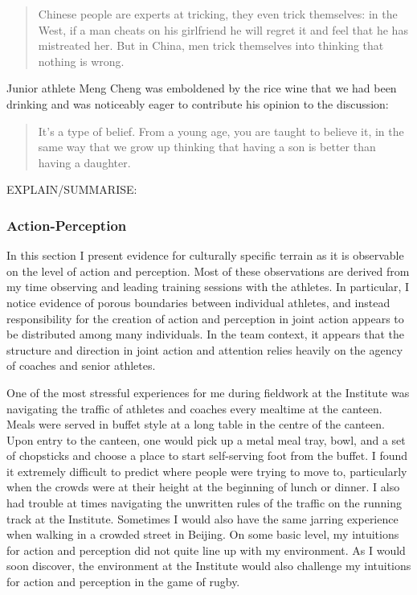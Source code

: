 \begin{CJK}{UTF8}{gbsn}
  \begin{quotation}
    Chinese people are experts at tricking, they even trick themselves: in the West, if a man cheats on his girlfriend he will regret it and feel that he has mistreated her.  But in China, men trick themselves into thinking that nothing is wrong.
  \end{quotation}


  Junior athlete Meng Cheng was emboldened by the rice wine that we had been drinking and was noticeably eager to contribute his opinion to the discussion:

  \begin{quotation}
    It's a type of belief. From a young age, you are taught to believe it, in the same way that we grow up thinking that having a son is better than having a daughter.
  \end{quotation}

  EXPLAIN/SUMMARISE:





  \subsubsection{Action-Perception}
  In this section I present evidence for culturally specific terrain as it is observable on the level of action and perception.  Most of these observations are derived from my time observing and leading training sessions with the athletes. In particular, I notice evidence of porous boundaries between individual athletes, and instead responsibility for the creation of action and perception in joint action appears to be distributed among many individuals.  In the team context, it appears that the structure and direction in joint action and attention relies heavily on the agency of coaches and senior athletes.

  One of the most stressful experiences for me during fieldwork at the Institute was navigating the traffic of athletes and coaches every mealtime at the canteen.  Meals were served in buffet style at a long table in the centre of the canteen. Upon entry to the canteen, one would pick up a metal meal tray, bowl, and a set of chopsticks and choose a place to start self-serving foot from the buffet.  I found it extremely difficult to predict where people were trying to move to, particularly when the crowds were at their height at the beginning of lunch or dinner. I also had trouble at times navigating the unwritten rules of the traffic on the running track at the Institute.  Sometimes I would also have the same jarring experience when walking in a crowded street in Beijing. On some basic level, my intuitions for action and perception did not quite line up with my environment.  As I would soon discover, the environment at the Institute would also challenge my intuitions for action and perception in the game of rugby.


\end{CJK}
